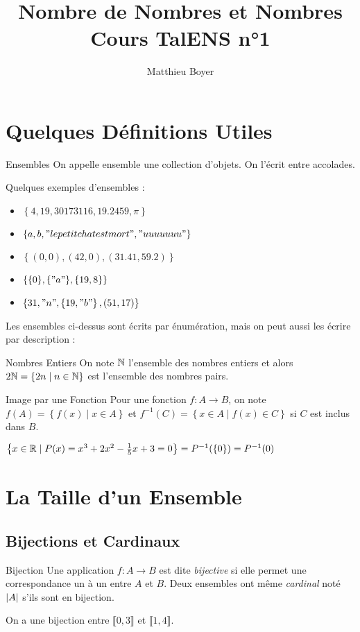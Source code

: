 \documentclass{cours}
\title{Nombre de Nombres et Nombres\\ \small Cours TalENS n°1}
\author{Matthieu Boyer}
\date{}
\begin{document}
    \section{Quelques Définitions Utiles}
    \begin{définition}{Ensembles}{}
        On appelle ensemble une collection d'objets. On l'écrit entre accolades. 
    \end{définition}
    \begin{example}
        Quelques exemples d'ensembles : 
        \begin{itemize}
            \item $\left\{4, 19, 30173116, 19.2459, \pi\right\} $
            \item $\left\{a, b, "le petit chat est mort", "uuuuuuu"\right\}$
            \item $\left\{(0,0), (42, 0), (31.41, 59.2)\right\}$
            \item $\left\{\{0\}, \{"a"\}, \{19, 8\}\right\}$
            \item $\left\{31, "n", \left\{19, "b"\right\}, (51, 17)\right\}$
        \end{itemize}
    \end{example}
    Les ensembles ci-dessus sont écrits par énumération, mais on peut aussi les écrire par description : 
    \begin{définition}{Nombres Entiers}{}
        On note $\mathbb{N}$ l'ensemble des nombres entiers et alors $2\mathbb{N} = \left\{2n \mid n \in \mathbb{N}\right\}$ est l'ensemble des nombres pairs.
    \end{définition}

    \begin{définition}{Image par une Fonction}{}
        Pour une fonction $f : A \rightarrow B$, on note $f(A) = \left\{f(x) \mid x \in A\right\}$ et $f^{-1}(C) = \left\{x \in A \mid f(x) \in C\right\}$ si $C$ est inclus dans $B$.
    \end{définition}
    \begin{example}
        $\left\{x \in \mathbb{R} \mid P(x) = x^{3} + 2x^{2} - \frac{1}{5}x + 3 = 0\right\} = P^{-1}(\{0\}) = P^{-1}(0)$
    \end{example}

    \section{La Taille d'un Ensemble}
    \subsection{Bijections et Cardinaux}
    \begin{définition}{Bijection}{}
        Une application $f : A \rightarrow B$ est dite \emph{bijective} si elle permet une correspondance un à un entre $A$ et $B$. Deux ensembles ont même \emph{cardinal} noté $\left|A\right|$ s'ils sont en bijection.    
    \end{définition}
    \begin{example}
        On a une bijection entre $\llbracket 0, 3\rrbracket$ et $\llbracket 1, 4\rrbracket$.
    \end{example}
\end{document}
